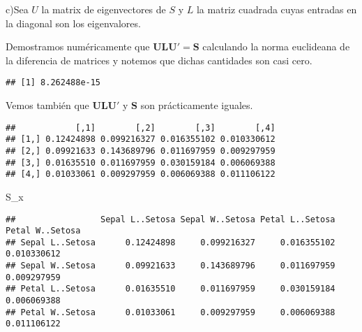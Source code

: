 \documentclass[
]{article}
\newenvironment{Shaded}{\begin{snugshade}}{\end{snugshade}}
\newcommand{\KeywordTok}[1]{\textcolor[rgb]{0.13,0.29,0.53}{\textbf{#1}}}
\newcommand{\NormalTok}[1]{#1}
\newcommand{\OperatorTok}[1]{\textcolor[rgb]{0.81,0.36,0.00}{\textbf{#1}}}
\newcommand{\StringTok}[1]{\textcolor[rgb]{0.31,0.60,0.02}{#1}}
\begin{document}
c)Sea \(U\) la matrix de eigenvectores de \(S\) y \(L\) la matriz
cuadrada cuyas entradas en la diagonal son los eigenvalores.

Demostramos numéricamente que \(\boldsymbol{ULU'}=\boldsymbol{S}\)
calculando la norma euclideana de la diferencia de matrices y notemos
que dichas cantidades son casi cero.

\begin{Shaded}
\end{Shaded}

\begin{verbatim}
## [1] 8.262488e-15
\end{verbatim}

Vemos también que \(\boldsymbol{ULU'}\) y \(\boldsymbol{S}\) son
prácticamente iguales.

\begin{Shaded}
\end{Shaded}

\begin{verbatim}
##            [,1]        [,2]        [,3]        [,4]
## [1,] 0.12424898 0.099216327 0.016355102 0.010330612
## [2,] 0.09921633 0.143689796 0.011697959 0.009297959
## [3,] 0.01635510 0.011697959 0.030159184 0.006069388
## [4,] 0.01033061 0.009297959 0.006069388 0.011106122
\end{verbatim}

\begin{Shaded}
\begin{Highlighting}[]
\NormalTok{S_x}
\end{Highlighting}
\end{Shaded}

\begin{verbatim}
##                 Sepal L..Setosa Sepal W..Setosa Petal L..Setosa Petal W..Setosa
## Sepal L..Setosa      0.12424898     0.099216327     0.016355102     0.010330612
## Sepal W..Setosa      0.09921633     0.143689796     0.011697959     0.009297959
## Petal L..Setosa      0.01635510     0.011697959     0.030159184     0.006069388
## Petal W..Setosa      0.01033061     0.009297959     0.006069388     0.011106122
\end{verbatim}
\end{document}
